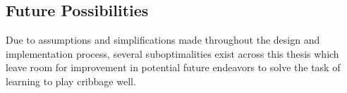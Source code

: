 
\subsection{Future Possibilities}
\label{sec:disc-future}

Due to assumptions and simplifications
made throughout the design and implementation process,
several suboptimalities exist across this thesis
which leave room for improvement in potential future endeavors to solve the task
of learning to play cribbage well.









